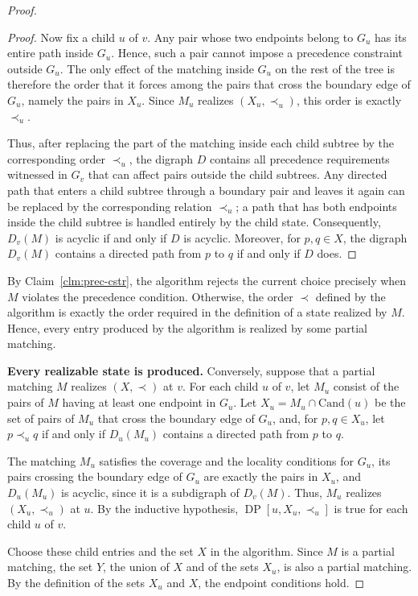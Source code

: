 \documentclass[a4paper,USenglish,thm-restate]{lipics-v2021}
\newcommand{\cand}{\mathrm{Cand}}
\theoremstyle{problemstyle}
\begin{document}
\begin{proof}
\begin{proof}
Now fix a child $u$ of $v$. Any pair whose two endpoints belong to $G_u$ has its entire path inside $G_u$. Hence, such a pair cannot impose a precedence constraint outside $G_u$. The only effect of the matching inside $G_u$ on the rest of the tree is therefore the order that it forces among the pairs that cross the boundary edge of $G_u$, namely the pairs in $X_u$. Since $M_u$ realizes $(X_u,\prec_u)$, this order is exactly $\prec_u$.
 
Thus, after replacing the part of the matching inside each child subtree by
the corresponding order $\prec_u$, the digraph $D$ contains all precedence
requirements witnessed in $G_v$ that can affect pairs outside the child
subtrees. Any directed path that enters a child subtree through a boundary
pair and leaves it again can be replaced by the corresponding relation
$\prec_u$; a path that has both endpoints inside the child subtree is handled
entirely by the child state. Consequently, $D_v(M)$ is acyclic if and only
if $D$ is acyclic. Moreover, for $p,q\in X$, the digraph $D_v(M)$ contains
a directed path from $p$ to $q$ if and only if $D$ does. \end{proof}
 
By Claim~\ref{clm:prec-cstr}, the algorithm rejects the current choice precisely when $M$ violates the precedence condition. Otherwise, the order $\prec$ defined by the algorithm is exactly the order required in the definition of a state realized by $M$. Hence, every entry produced by the algorithm is realized by some partial matching.
 
\smallskip
\noindent\textbf{Every realizable state is produced.}
Conversely, suppose that a partial matching $M$ realizes $(X,\prec)$ at $v$. For each child $u$ of $v$, let $M_u$ consist of the pairs of $M$ having at least one endpoint in $G_u$. Let $X_u=M_u\cap\cand(u)$ be the set of pairs of $M_u$ that cross the boundary edge of $G_u$, and, for $p,q\in X_u$, let $p\prec_u q$ if and only if $D_u(M_u)$ contains a directed path from $p$ to $q$.
 
The matching $M_u$ satisfies the coverage and the locality conditions for $G_u$, its pairs crossing the boundary edge of $G_u$ are exactly the pairs in $X_u$, and $D_u(M_u)$ is acyclic, since it is a subdigraph of $D_v(M)$. Thus, $M_u$ realizes $(X_u,\prec_u)$ at $u$. By the inductive hypothesis, $\operatorname{DP}[u,X_u,\prec_u]$ is true for each child $u$ of $v$.
 
Choose these child entries and the set $X$ in the algorithm. Since $M$ is a partial matching, the set $Y$, the union of $X$ and of the sets $X_u$, is also a partial matching. By the definition of the sets $X_u$ and $X$, the endpoint conditions hold.
 

\end{proof}
\end{document}
